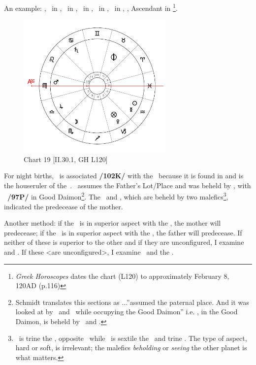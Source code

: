 An example: \Sun, \Mercury\, in \Aquarius, \Moon\, in \Scorpio, \Saturn\, in \Cancer, \Jupiter\, in \Libra, \Venus\, in \Capricorn, \Mars, Ascendant in \Virgo
\footnote{\textit{Greek Horoscopes} dates the chart (L120) to approximately February 8, 120AD (p.116)}.

\clearpage
\begin{figure}
\centering
\vspace{-20pt}
\includegraphics[width=0.68\textwidth]{charts/2_30_1}
\caption{Chart 19 [II.30.1, GH L120]}
\label{fig:chart19}
\end{figure}

For night births, \Saturn\, is associated \textbf{/102K/} with the \Moon\, because it is found in  and is the houseruler of the \Sun\,. \Saturn\, assumes the Father’s Lot/Place and was beheld by \Jupiter, with \Venus\, \textbf{/97P/} in Good Daimon\footnote{Schmidt translates this sections as \Saturn...''assumed the paternal place. And it was looked at by \Jupiter\, and \Venus\, while occupying the Good Daimon'' i.e. \Saturn, in the Good Daimon, is beheld by \Jupiter\, and \Venus.}. The \Moon\, and \Venus, which are beheld by two malefics\footnote{\Saturn\, is trine the \Moon, opposite \Venus\, while \Mars\, is sextile the \Moon\, and trine \Venus. The type of aspect, hard or soft, is irrelevant; the malefics \textsl{beholding} or \textsl{seeing} the other planet is what matters.}, indicated the predecease of the mother.

Another method: if the \Sun\, is in superior aspect with the \Moon, the mother will predecease; if the \Moon\, is in superior aspect with the \Sun, the father will predecease. If neither of these is superior to the other and if they are unconfigured, I examine \Saturn\, and \Venus. If these <are unconfigured>, I examine \Saturn\, and the \Moon. 

